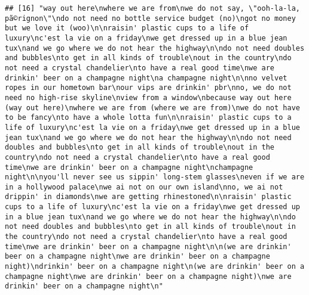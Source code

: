 \documentclass[]{article}
\begin{document}
\begin{verbatim}
## [16] "way out here\nwhere we are from\nwe do not say, \"ooh-la-la, pã©rignon\"\ndo not need no bottle service budget (no)\ngot no money but we love it (woo)\n\nraisin' plastic cups to a life of luxury\nc'est la vie on a friday\nwe get dressed up in a blue jean tux\nand we go where we do not hear the highway\n\ndo not need doubles and bubbles\nto get in all kinds of trouble\nout in the country\ndo not need a crystal chandelier\nto have a real good time\nwe are drinkin' beer on a champagne night\na champagne night\n\nno velvet ropes in our hometown bar\nour vips are drinkin' pbr\nno, we do not need no high-rise skyline\nview from a window\nbecause way out here (way out here)\nwhere we are from (where we are from)\nwe do not have to be fancy\nto have a whole lotta fun\n\nraisin' plastic cups to a life of luxury\nc'est la vie on a friday\nwe get dressed up in a blue jean tux\nand we go where we do not hear the highway\n\ndo not need doubles and bubbles\nto get in all kinds of trouble\nout in the country\ndo not need a crystal chandelier\nto have a real good time\nwe are drinkin' beer on a champagne night\nchampagne night\n\nyou'll never see us sippin' long-stem glasses\neven if we are in a hollywood palace\nwe ai not on our own island\nno, we ai not drippin' in diamonds\nwe are getting rhinestoned\n\nraisin' plastic cups to a life of luxury\nc'est la vie on a friday\nwe get dressed up in a blue jean tux\nand we go where we do not hear the highway\n\ndo not need doubles and bubbles\nto get in all kinds of trouble\nout in the country\ndo not need a crystal chandelier\nto have a real good time\nwe are drinkin' beer on a champagne night\n\n(we are drinkin' beer on a champagne night\nwe are drinkin' beer on a champagne night)\ndrinkin' beer on a champagne night\n(we are drinkin' beer on a champagne night\nwe are drinkin' beer on a champagne night)\nwe are drinkin' beer on a champagne night\n"                                                                                                                                                                                                                                                                                                                                                                                                                                                                                                                                                                                                                                                                                                                                                                                                                                                                                                                                                                                            

\end{verbatim}
\end{document}
